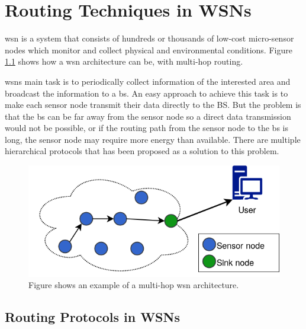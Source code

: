 \documentclass[USenglish]{uit-thesis}
\newcommand{\definition}[1]{%
  \refstepcounter{definition}%
  \par\noindent\textbf{The Definition~\thedefinition. #1}%
  \addcontentsline{def}{definition}
    {\protect\numberline{\thechapter.\thedefinition}#1}\par%
}
\begin{document}




\chapter{Routing Techniques in WSNs}
\glsresetall
\gls{wsn} is a system that consists of hundreds or thousands of low-cost micro-sensor nodes which monitor and collect physical and environmental conditions. Figure \ref{fig:wsn} shows how a \gls{wsn} architecture can be, with multi-hop routing. 


\gls{wsn}s  main task is to periodically collect information of the interested area and broadcast the information to a \gls{bs}. An easy approach to achieve this task is to make each sensor node transmit their data directly to the BS. But the problem is that the \gls{bs} can be far away from the sensor node so a direct data transmission would not be possible, or if the routing path from the sensor node to the \gls{bs} is long, the sensor node may require more energy than available. There are multiple hierarchical protocols that has been proposed as a solution to this problem.

\begin{figure} [!ht]
\centering
\includegraphics[width=\textwidth]{wsn.png}
\caption{Figure shows an example of a multi-hop \gls{wsn} architecture.}
\label{fig:wsn}
\end{figure}


\section{Routing Protocols in WSNs}
\end{document}
